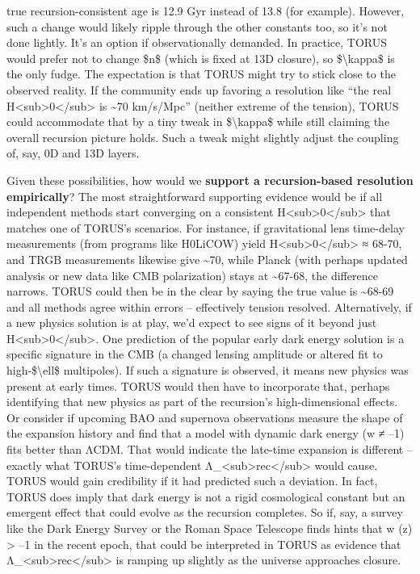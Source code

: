 \documentclass[
]{article}
\begin{document}
\begin{enumerate}
  true recursion-consistent age is 12.9 Gyr instead of 13.8 (for
  example). However, such a change would likely ripple through the other
  constants too, so it's not done lightly. It's an option if
  observationally demanded. In practice, TORUS would prefer not to
  change \$n\$ (which is fixed at 13D closure), so
  \$\textbackslash kappa\$ is the only fudge. The expectation is that
  TORUS might try to stick close to the observed reality. If the
  community ends up favoring a resolution like ``the real
  H\textless sub\textgreater0\textless/sub\textgreater{} is
  \textasciitilde70 km/s/Mpc'' (neither extreme of the tension), TORUS
  could accommodate that by a tiny tweak in \$\textbackslash kappa\$
  while still claiming the overall recursion picture holds\hspace{0pt}.
  Such a tweak might slightly adjust the coupling of, say, 0D and 13D
  layers.
\end{enumerate}

Given these possibilities, how would we \textbf{support a
recursion-based resolution empirically}? The most straightforward
supporting evidence would be if all independent methods start converging
on a consistent H\textless sub\textgreater0\textless/sub\textgreater{}
that matches one of TORUS's scenarios. For instance, if gravitational
lens time-delay measurements (from programs like H0LiCOW) yield
H\textless sub\textgreater0\textless/sub\textgreater{} ≈ 68-70, and TRGB
measurements likewise give \textasciitilde70, while Planck (with perhaps
updated analysis or new data like CMB polarization) stays at
\textasciitilde67-68, the difference narrows. TORUS could then be in the
clear by saying the true value is \textasciitilde68-69 and all methods
agree within errors -- effectively tension resolved. Alternatively, if a
new physics solution is at play, we'd expect to see signs of it beyond
just H\textless sub\textgreater0\textless/sub\textgreater. One
prediction of the popular early dark energy solution is a specific
signature in the CMB (a changed lensing amplitude or altered fit to
high-\$\textbackslash ell\$ multipoles). If such a signature is
observed, it means new physics was present at early times. TORUS would
then have to incorporate that, perhaps identifying that new physics as
part of the recursion's high-dimensional effects. Or consider if
upcoming BAO and supernova observations measure the shape of the
expansion history and find that a model with dynamic dark energy (w ≠
--1) fits better than ΛCDM. That would indicate the late-time expansion
is different -- exactly what TORUS's time-dependent
Λ\_\textless sub\textgreater rec\textless/sub\textgreater{} would cause.
TORUS would gain credibility if it had predicted such a deviation. In
fact, TORUS does imply that dark energy is not a rigid cosmological
constant but an emergent effect that could evolve as the recursion
completes\hspace{0pt}. So if, say, a survey like the Dark Energy Survey
or the Roman Space Telescope finds hints that w (z) \textgreater{} --1
in the recent epoch, that could be interpreted in TORUS as evidence that
Λ\_\textless sub\textgreater rec\textless/sub\textgreater{} is ramping
up slightly as the universe approaches closure.
\end{document}
